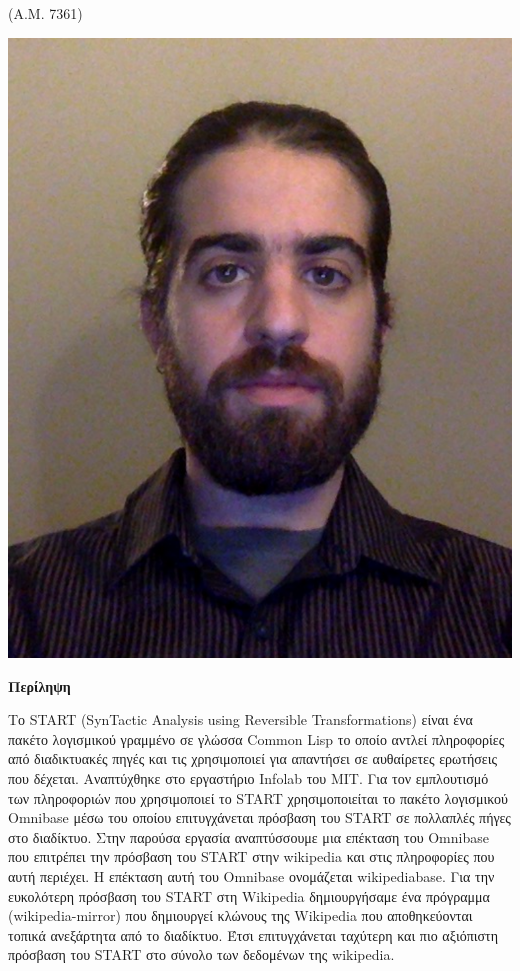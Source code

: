 {\begin{minipage}{.8\textwidth}
    (A.M. 7361)
    \end{minipage}
    \begin{minipage}{.2\textwidth}
    \includegraphics[width=\linewidth]{me.png}
    \end{minipage}

\large\textbf{Περίληψη}

  Το START (SynTactic Analysis using Reversible Transformations) είναι
  ένα πακέτο λογισμικού γραμμένο σε γλώσσα Common Lisp το οποίο αντλεί
  πληροφορίες από διαδικτυακές πηγές και τις χρησιμοποιεί για
  απαντήσει σε αυθαίρετες ερωτήσεις που δέχεται. Αναπτύχθηκε στο
  εργαστήριο Infolab του MIT. Για τον εμπλουτισμό των πληροφοριών που
  χρησιμοποιεί το START χρησιμοποιείται το πακέτο λογισμικού Omnibase
  μέσω του οποίου επιτυγχάνεται πρόσβαση του START σε πολλαπλές πήγες
  στο διαδίκτυο. Στην παρούσα εργασία αναπτύσσουμε μια επέκταση του
  Omnibase που επιτρέπει την πρόσβαση του START στην wikipedia και
  στις πληροφορίες που αυτή περιέχει. Η επέκταση αυτή του Omnibase
  ονομάζεται wikipediabase.  Για την ευκολότερη πρόσβαση του START στη
  Wikipedia δημιουργήσαμε ένα πρόγραμμα (wikipedia-mirror) που
  δημιουργεί κλώνους της Wikipedia που αποθηκεύονται τοπικά ανεξάρτητα
  από το διαδίκτυο.  Έτσι επιτυγχάνεται ταχύτερη και πιο αξιόπιστη
  πρόσβαση του START στο σύνολο των δεδομένων της wikipedia.

}
